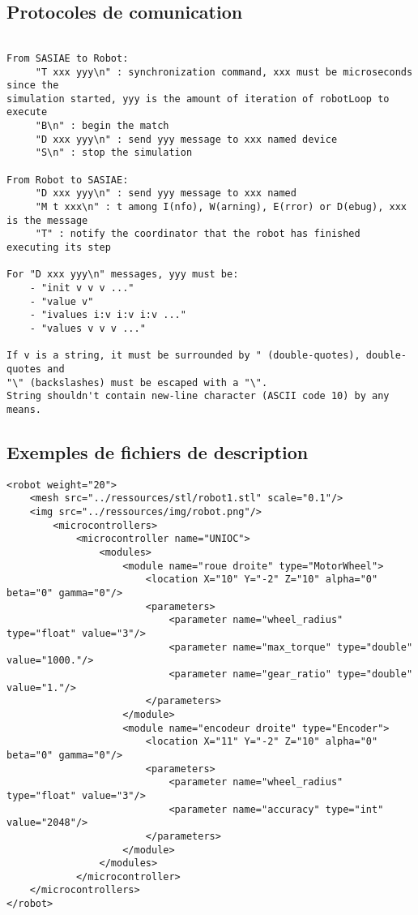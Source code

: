 \subsection{Protocoles de comunication}
\label{convcomm}
\begin{verbatim}

From SASIAE to Robot:
     "T xxx yyy\n" : synchronization command, xxx must be microseconds since the
simulation started, yyy is the amount of iteration of robotLoop to execute
     "B\n" : begin the match
     "D xxx yyy\n" : send yyy message to xxx named device
     "S\n" : stop the simulation

From Robot to SASIAE:
     "D xxx yyy\n" : send yyy message to xxx named
     "M t xxx\n" : t among I(nfo), W(arning), E(rror) or D(ebug), xxx is the message
     "T" : notify the coordinator that the robot has finished executing its step

For "D xxx yyy\n" messages, yyy must be:
    - "init v v v ..."
    - "value v"
    - "ivalues i:v i:v i:v ..."
    - "values v v v ..."

If v is a string, it must be surrounded by " (double-quotes), double-quotes and
"\" (backslashes) must be escaped with a "\".
String shouldn't contain new-line character (ASCII code 10) by any means.

\end{verbatim}
\subsection{Exemples de fichiers de description}
\label{descXML}

\begin{lstlisting}[caption=Exemple de description d'un robot, label=desctable]
<robot weight="20">
    <mesh src="../ressources/stl/robot1.stl" scale="0.1"/>
    <img src="../ressources/img/robot.png"/>
        <microcontrollers>
            <microcontroller name="UNIOC">
                <modules>
                    <module name="roue droite" type="MotorWheel">
                        <location X="10" Y="-2" Z="10" alpha="0" beta="0" gamma="0"/>
                        <parameters>
                            <parameter name="wheel_radius" type="float" value="3"/>
                            <parameter name="max_torque" type="double" value="1000."/>
                            <parameter name="gear_ratio" type="double" value="1."/>
                        </parameters>
                    </module>
                    <module name="encodeur droite" type="Encoder">
                        <location X="11" Y="-2" Z="10" alpha="0" beta="0" gamma="0"/>
                        <parameters>
                            <parameter name="wheel_radius" type="float" value="3"/>
                            <parameter name="accuracy" type="int" value="2048"/>
                        </parameters>
                    </module>
                </modules>
            </microcontroller>
    </microcontrollers>
</robot>
\end{lstlisting}

